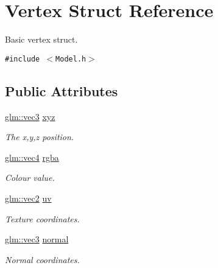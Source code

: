 \hypertarget{struct_vertex}{
\section{Vertex Struct Reference}
\label{struct_vertex}
}
Basic vertex struct.  


{\tt \#include $<$Model.h$>$}

\subsection*{Public Attributes}
\begin{CompactItemize}
\item 
\hypertarget{struct_vertex_4dbe881b311fbf8bb2c39e437f42f6dd}{
\hyperlink{group__core__types_g1c47e8b3386109bc992b6c48e91b0be7}{glm::vec3} \hyperlink{struct_vertex_4dbe881b311fbf8bb2c39e437f42f6dd}{xyz}}
\label{struct_vertex_4dbe881b311fbf8bb2c39e437f42f6dd}

\begin{CompactList}\small\item\em The x,y,z position. \item\end{CompactList}\item 
\hypertarget{struct_vertex_a8dea45a8d8fbea4f13b40d56c07aa78}{
\hyperlink{group__core__types_g5881b1b022d7fd1b7218f5916532dd02}{glm::vec4} \hyperlink{struct_vertex_a8dea45a8d8fbea4f13b40d56c07aa78}{rgba}}
\label{struct_vertex_a8dea45a8d8fbea4f13b40d56c07aa78}

\begin{CompactList}\small\item\em Colour value. \item\end{CompactList}\item 
\hypertarget{struct_vertex_8d5cc8548016889746f251d98377ec8a}{
\hyperlink{group__core__types_ga1618f51db67eaa145db101d8c8431d8}{glm::vec2} \hyperlink{struct_vertex_8d5cc8548016889746f251d98377ec8a}{uv}}
\label{struct_vertex_8d5cc8548016889746f251d98377ec8a}

\begin{CompactList}\small\item\em Texture coordinates. \item\end{CompactList}\item 
\hypertarget{struct_vertex_3aa35fe84025ecf1acccb5f65f5577fd}{
\hyperlink{group__core__types_g1c47e8b3386109bc992b6c48e91b0be7}{glm::vec3} \hyperlink{struct_vertex_3aa35fe84025ecf1acccb5f65f5577fd}{normal}}
\label{struct_vertex_3aa35fe84025ecf1acccb5f65f5577fd}

\begin{CompactList}\small\item\em Normal coordinates. \item\end{CompactList}\end{CompactItemize}


